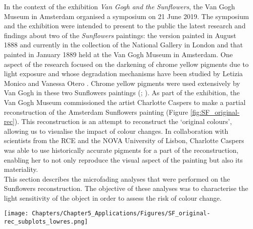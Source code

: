 In the context of the exhibition \textit{Van Gogh and the Sunflowers}, the Van Gogh Museum in Amsterdam organised a symposium on 21 June 2019. The symposium and the exhibition were intended to present to the public the latest research and findings about two of the \textit{Sunflowers} paintings: the version painted in August 1888 and currently in the collection of the National Gallery in London and that painted in January 1889 held at the Van Gogh Museum in Amsterdam. One aspect of the research focused on the darkening of chrome yellow pigments due to light exposure and whose degradation mechanisms have been studied by Letizia Monico \citep{monico_degradation_2011,monico_degradation_2013,monico_degradation_2013-1,monico_disclosing_2019} and Vanessa Otero \citeyearpar{otero_historically_2018}. Chrome yellow pigments were used extensively by Van Gogh in these two Sunflowers paintings (\citealp{higgitt_methods_2019}; \citealp[107]{hendriks_methods_2019}). As part of the exhibition, the Van Gogh Museum commissioned the artist Charlotte Caspers to make a partial reconstruction of the Amsterdam Sunflowers painting (Figure  \ref{fig:SF_original-rec}). This reconstruction is an attempt to reconstruct the ‘original colours’, allowing us to visualise the impact of colour changes. In collaboration with scientists from the \gls{RCE} and the NOVA University of Lisbon, Charlotte Caspers was able to use historically accurate pigments for a part of the reconstruction, enabling her to not only reproduce the visual aspect of the painting but also its materiality. \\

This section describes the microfading analyses that were performed on the Sunflowers reconstruction. The objective of these analyses was to characterise the light sensitivity of the object in order to assess the risk of colour change. \\


\begin{figure*}
\centering
\texttt{[image: Chapters/Chapter5\_Applications/Figures/SF\_original-rec\_subplots\_lowres.png]}
\caption[\hspace{0.3cm}The \textit{Sunflowers} paintings: original vs reconstruction]{The \textit{Sunflowers} paintings: detail of the Amsterdam \textit{Sunflowers} painting (a) ; reconstructed painting made by Charlotte Caspers (b). (\copyright Van Gogh Museum, Amsterdam (Vincent van Gogh Foundation))}
\label{fig:SF_original-rec}
\end{figure*}


